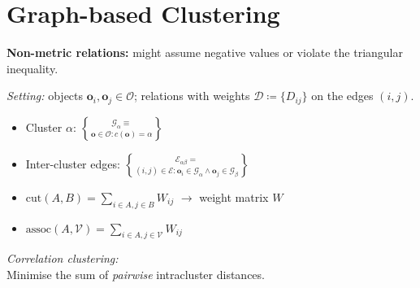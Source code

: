 \section{Graph-based Clustering}


\textbf{Non-metric relations:}
might assume negative values or violate the triangular inequality.

\emph{Setting:}\enspace
objects $\symbf o_i, \symbf o_j \in \mathcal O$;\:
relations with weights $\mathcal D \coloneqq \{ D_{ij} \}$ on the edges $(i, j)$.

\begin{itemize}
    \item Cluster $\alpha$:\enskip
        $\mathcal G_\alpha \equiv \brace{\symbf o\in \mathcal O : c(\symbf o) = \alpha}$
    \item Inter-cluster edges:\enskip
        $\mathcal E_{\alpha\beta} = \brace{(i,j) \in \mathcal E : \symbf o_i \in \mathcal G_\alpha \land \symbf o_j \in \mathcal G_\beta}$
    \item $\mathrm{cut}(A,B) = \sum_{i\in A, j\in B} W_{ij}$\enskip
        {\small $\to$ weight matrix $W$}
    \item $\mathrm{assoc}(A,\mathcal V) = \sum_{i\in A, j\in \mathcal V} W_{ij}$
\end{itemize}

\emph{Correlation clustering:}\\
Minimise the sum of \textit{pairwise} intracluster distances.

